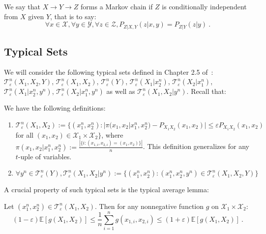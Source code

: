 \begin{definition}
We say that $X \rightarrow Y \rightarrow Z$ forms a Markov chain if $Z$ is conditionally independent from $X$ given $Y$, that is to say:
\[\forall x \in \mathcal{X},\forall y \in \mathcal{Y},\forall z \in \mathcal{Z}, P_{Z|X,Y}(z|x,y) = P_{Z|Y}(z|y)   \ .\]
\end{definition}

\subsection{Typical Sets}
\label{subsection:typicalSets}
We will consider the following typical sets defined in Chapter 2.5 of~\cite{GK11}: $\mathcal{T}^n_{\varepsilon}(X_1,X_2,Y)$, $\mathcal{T}^n_{\varepsilon}(X_1,X_2)$, $\mathcal{T}^n_{\varepsilon}(Y)$, $\mathcal{T}^n_{\varepsilon}(X_1|x_2^n)$, $\mathcal{T}^n_{\varepsilon}(X_2|x_1^n)$, $\mathcal{T}^n_{\varepsilon}(X_1|x_2^n,y^n)$, $\mathcal{T}^n_{\varepsilon}(X_2|x_1^n,y^n)$ as well as $\mathcal{T}^n_{\varepsilon}(X_1,X_2|y^n)$. Recall that:
      \begin{definition}
        We have the following definitions:
        \begin{enumerate}
        \item $\mathcal{T}^n_{\varepsilon}(X_1,X_2) := \{(x_1^n,x_2^n) : |\pi(x_1,x_2|x_1^n,x_2^n) - P_{X_1X_2}(x_1,x_2)|\leq \varepsilon P_{X_1X_2}(x_1,x_2)$ for all $(x_1,x_2) \in \mathcal{X}_1 \times \mathcal{X}_2\}$, where $\pi(x_1,x_2|x_1^n,x_2^n) := \frac{|\{i : (x_{1,i},x_{2,i}) = (x_1,x_2)\}|}{n}$. This definition generalizes for any $t$-uple of variables.
    \item $\forall y^n \in \mathcal{T}^n_{\varepsilon}(Y), \mathcal{T}^n_{\varepsilon}(X_1,X_2|y^n) := \{ (x_1^n,x_2^n) : (x_1^n,x_2^n,y^n) \in \mathcal{T}^n_{\varepsilon}(X_1,X_2,Y) \}$
        \end{enumerate}
      \end{definition}

      A crucial property of such typical sets is the typical average lemma:

      \begin{lemma}
        Let $(x_1^n,x_2^n) \in \mathcal{T}^n_{\varepsilon}(X_1,X_2)$. Then for any nonnegative function $g$ on $\mathcal{X}_1\times\mathcal{X}_2$:
        \[ (1-\varepsilon)\mathbb{E}[g(X_1,X_2)] \leq \frac{1}{n}\sum_{i=1}^ng(x_{1,i},x_{2,i}) \leq (1+\varepsilon)\mathbb{E}[g(X_1,X_2)] \ . \]
      \end{lemma}
      
